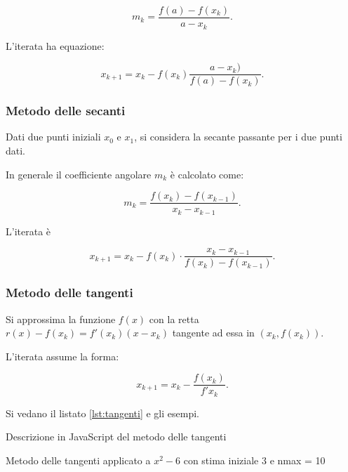 \documentclass[10pt]{article}
\begin{document}
$$\displaystyle m_k = \frac{f(a)  - f(x_k)}{a - x_k}.$$

L'iterata ha equazione:

$$x_{k+1} = x_k - f(x_k) \frac{a  - x_k)}{f(a) - f(x_k)}.$$



\subsubsection{Metodo delle secanti}

Dati due punti iniziali $x_0$ e $x_1$, si considera la secante passante per i due punti dati.

In generale il coefficiente angolare $m_k$ è calcolato come:

$$m_k = \frac{f(x_k) - f(x_{k-1})}{x_k - x_{k-1}}.$$

L'iterata è

$$x_{k+1} = x_k - f(x_k) \cdot \frac{x_k - x_{k-1}}{f(x_k) - f(x_{k-1})}.$$

\subsubsection{Metodo delle tangenti}

Si approssima la funzione $f(x)$ con la retta $r(x) - f(x_k) = f'(x_k) (x - x_k)$ tangente ad essa in $(x_k, f(x_k))$.

L'iterata assume la forma:

$$x_{k+1} = x_k - \frac{f(x_k)}{f'{x_k}}.$$

Si vedano il listato \ref{lst:tangenti} e gli esempi.

\begin{lstfloat}
    
    \caption{Descrizione in JavaScript del metodo delle tangenti}
    \label{lst:tangenti}
\end{lstfloat}

\begin{table}
    \begin{center}
\end{center}        
\caption[]{Metodo delle tangenti applicato a $x^2 -6$ con stima iniziale 3 e nmax = 10}
\end{table}
\end{document}
